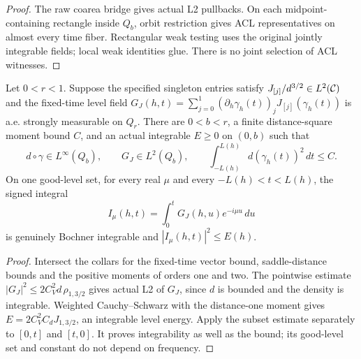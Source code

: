 \begin{proof}
\leanok
The raw coarea bridge gives actual L2 pullbacks. On each midpoint-containing
rectangle inside $Q_b$, orbit restriction gives ACL representatives on almost
every time fiber. Rectangular weak testing uses the original jointly integrable
fields; local weak identities glue. There is no joint selection of ACL witnesses.
\end{proof}

\begin{lemma}
\label{lem:ordinary-quarter-forcing-data}
\leanok
Let $0<r<1$. Suppose the specified singleton entries satisfy
$J_{[j]}/d^{3/2}\in L^2(\mathcal{C})$ and the fixed-time level field
$G_J(h,t)=\sum_{j=0}^1(\partial_h\gamma_h(t))_jJ_{[j]}(\gamma_h(t))$
is a.e. strongly measurable on $Q_r$.
There are $0<b<r$, a finite distance-square moment bound $C$, and an
actual integrable $E\ge0$ on $(0,b)$ such that
\[
 d\circ\gamma\in L^\infty(Q_b),\qquad G_J\in L^2(Q_b),\qquad
 \int_{-L(h)}^{L(h)}d(\gamma_h(t))^2\,dt\le C .
\]
On one good-level set, for every real $\mu$ and every $-L(h)<t<L(h)$,
the signed integral
\[
 I_\mu(h,t)=\int_0^tG_J(h,u)e^{-i\mu u}\,du
\]
is genuinely Bochner integrable and $|I_\mu(h,t)|^2\le E(h)$.
\end{lemma}

\begin{proof}
\leanok
Intersect the collars for the fixed-time vector bound, saddle-distance bounds
and the positive moments of orders one and two.
The pointwise estimate $|G_J|^2\le 2C_V^2d\,\rho_{1,3/2}$ gives actual L2
of $G_J$, since $d$ is bounded and the density is integrable.
Weighted Cauchy--Schwarz with the distance-one moment gives
$E=2C_V^2C_dJ_{1,3/2}$, an integrable level energy.
Apply the subset estimate separately to $[0,t]$ and $[t,0]$.
It proves integrability as well as the bound; its good-level set and constant
do not depend on frequency.
\end{proof}

